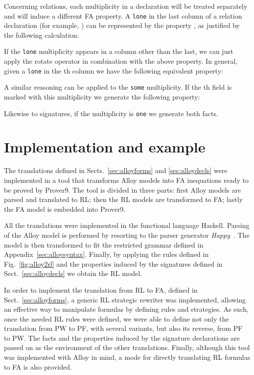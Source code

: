 \documentclass{llncs}
\begin{document}
Concerning relations, each multiplicity in a declaration will be
treated separately and will induce a different FA property. A
\texttt{lone} in the last column of a relation declaration (for
example, ) can be represented by
the property , as justified by the
following calculation:

If the \texttt{lone} multiplicity appears in a column other than the
last, we can just apply the rotate operator in combination with the above property. In general, given a \texttt{lone} in the th column we have the following equivalent property:

A similar reasoning can be applied to the \texttt{some}
multiplicity. If the th field is marked with this multiplicity we
generate the following property:

Likewise to signatures, if the multiplicity is \texttt{one} we generate both facts.

\section{Implementation and example}
\label{sec:example}

The translations defined in Sects.~\ref{sec:alloyforms} and
\ref{sec:alloydecls} were implemented in a tool that transforms Alloy
models into FA inequations ready to be proved by Prover9. The tool is
divided in three parts: first Alloy models are parsed and translated
to RL; then the RL models are transformed to FA; lastly the FA model
is embedded into Prover9.

All the translations were implemented in the functional language
Haskell. Parsing of the Alloy model is performed by resorting to the
parser generator \emph{Happy}~\cite{happy}. The model is then
transformed to fit the restricted grammar defined in
Appendix~\ref{sec:alloysyntax}. Finally, by applying the rules defined in
Fig.~\ref{fig:alloy2rl} and the properties induced by the signatures
defined in Sect.~\ref{sec:alloydecls} we obtain the RL model.

In order to implement the translation from RL to FA, defined in
Sect.~\ref{sec:alloyforms}, a generic RL strategic rewriter was
implemented, allowing an effective way to manipulate formulas by
defining rules and strategies. As such, once the needed RL rules were
defined, we were able to define not only the translation from PW to
PF, with several variants, but also its reverse, from PF to PW. The
facts and the properties induced by the signature declarations are
passed on as the environment of the other translations. Finally,
although this tool was implemented with Alloy in mind, a mode for
directly translating RL formulas to FA is also provided.
\end{document}

